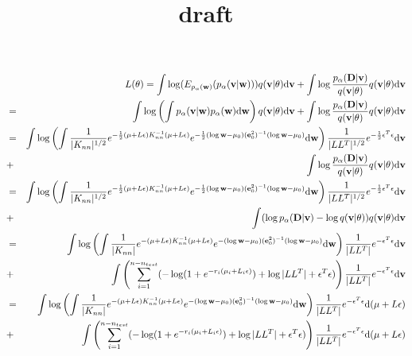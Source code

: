 \documentclass{article}
\def\e{{\bf e}}
\def\v{{\bf v}}
\def\w{{\bf w}}
\def\D{{\bf D}}
\def\d{{\mathrm{d}}}
\begin{document}
\title{draft}

\begin{eqnarray}
\setlength{\abovedisplayskip}{0pt}
\setlength{\belowdisplayskip}{0pt}
\nonumber
&&L(\theta) =  \int  \log(E_{p_{\alpha}(\w)}(p_{\alpha}(\v|\w))) q(\v|\theta) \d \v + \int \log\frac{p_{\alpha}(\D|\v)}{q(\v|\theta)} q(\v|\theta) \d \v \\ \nonumber
&=& \int  \log\left( \int p_{\alpha}(\v|\w) p_{\alpha}(\w)\d\w \right)  q(\v|\theta) \d\v + \int \log\frac{p_{\alpha}(\D|\v)}{q(\v|\theta)} q(\v|\theta) \d \v \\ \nonumber
&=& \int  \log\left( \int \frac{1}{|K_{nn}|^{1/2}}e^{-\frac{1}{2}(\mu+L\epsilon)K_{nn}^{-1}(\mu+L\epsilon)} e^{-\frac{1}{2}(\log \w - \mu_0)(\e_0^2)^{-1}(\log \w - \mu_0)}\d\w \right)\frac{1}{|LL^T|^{1/2}}e^{-\frac{1}{2}\epsilon^T \epsilon} \d\v \\ \nonumber
&+& \int \log\frac{p_{\alpha}(\D|\v)}{q(\v|\theta)} q(\v|\theta) \d\v \\ \nonumber
&=& \int  \log\left( \int \frac{1}{|K_{nn}|^{1/2}}e^{-\frac{1}{2}(\mu+L\epsilon)K_{nn}^{-1}(\mu+L\epsilon)} e^{-\frac{1}{2}(\log \w - \mu_0)(\e_0^2)^{-1}(\log \w - \mu_0)}\d\w \right)\frac{1}{|LL^T|^{1/2}}e^{-\frac{1}{2}\epsilon^T \epsilon} \d\v \\ \nonumber
&+& \int (\log p_{\alpha}(\D|\v) - \log q(\v|\theta)) q(\v|\theta) \d\v \\ \nonumber
&=& \int  \log\left( \int \frac{1}{|K_{nn}|}e^{-(\mu+L\epsilon)K_{nn}^{-1}(\mu+L\epsilon)} e^{-(\log \w - \mu_0)(\e_0^2)^{-1}(\log \w - \mu_0)}\d\w \right)\frac{1}{|LL^T|}e^{-\epsilon^T \epsilon} \d\v \\ \nonumber
&+& \int \left( \sum\limits_{i=1}^{n-n_{test}}(-\log(1+e^{-r_i(\mu_i+L_i\epsilon)}) + \log|LL^{T}|+\epsilon^{T}\epsilon) \right)\frac{1}{|LL^T|}e^{-\epsilon^{T}\epsilon} \d\v \\ \nonumber
&=& \int  \log\left( \int \frac{1}{|K_{nn}|}e^{-(\mu+L\epsilon)K_{nn}^{-1}(\mu+L\epsilon)} e^{-(\log \w - \mu_0)(\e_0^2)^{-1}(\log \w - \mu_0)}\d\w \right)\frac{1}{|LL^T|}e^{-\epsilon^T \epsilon} \d (\mu+L\epsilon) \\ \nonumber
&+& \int \left( \sum\limits_{i=1}^{n-n_{test}}(-\log(1+e^{-r_i(\mu_i+L_i\epsilon)}) + \log|LL^{T}|+\epsilon^{T}\epsilon) \right)\frac{1}{|LL^T|}e^{-\epsilon^{T}\epsilon} \d(\mu+L\epsilon) \\ \nonumber
\end{eqnarray}
\end{document}
